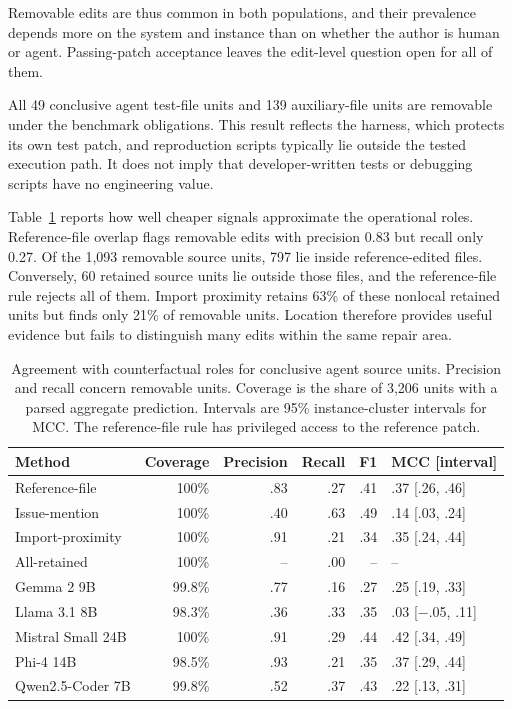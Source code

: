 \documentclass[a4paper,fleqn]{cas-sc}
\begin{document}
Removable edits are thus common in both populations, and their prevalence depends more on the system and instance than on whether the author is human or agent. Passing-patch acceptance leaves the edit-level question open for all of them.

All 49 conclusive agent test-file units and 139 auxiliary-file units are removable under the benchmark obligations. This result reflects the harness, which protects its own test patch, and reproduction scripts typically lie outside the tested execution path. It does not imply that developer-written tests or debugging scripts have no engineering value.

Table~\ref{tab:comparisons} reports how well cheaper signals approximate the operational roles. Reference-file overlap flags removable edits with precision 0.83 but recall only 0.27. Of the 1,093 removable source units, 797 lie inside reference-edited files. Conversely, 60 retained source units lie outside those files, and the reference-file rule rejects all of them. Import proximity retains 63\% of these nonlocal retained units but finds only 21\% of removable units. Location therefore provides useful evidence but fails to distinguish many edits within the same repair area.

\begin{table}[pos=htbp]
\caption{Agreement with counterfactual roles for conclusive agent source units. Precision and recall concern removable units. Coverage is the share of 3,206 units with a parsed aggregate prediction. Intervals are 95\% instance-cluster intervals for MCC. The reference-file rule has privileged access to the reference patch.}
\label{tab:comparisons}
\centering\small
\begin{tabular}{lrrrrl}
\toprule
Method & Coverage & Precision & Recall & F1 & MCC [interval] \\
\midrule
Reference-file & 100\% & .83 & .27 & .41 & .37 [.26, .46] \\
Issue-mention & 100\% & .40 & .63 & .49 & .14 [.03, .24] \\
Import-proximity & 100\% & .91 & .21 & .34 & .35 [.24, .44] \\
All-retained & 100\% & -- & .00 & -- & -- \\
\midrule
Gemma 2 9B & 99.8\% & .77 & .16 & .27 & .25 [.19, .33] \\
Llama 3.1 8B & 98.3\% & .36 & .33 & .35 & .03 [$-$.05, .11] \\
Mistral Small 24B & 100\% & .91 & .29 & .44 & .42 [.34, .49] \\
Phi-4 14B & 98.5\% & .93 & .21 & .35 & .37 [.29, .44] \\
Qwen2.5-Coder 7B & 99.8\% & .52 & .37 & .43 & .22 [.13, .31] \\
\bottomrule
\end{tabular}
\end{table}
\end{document}
